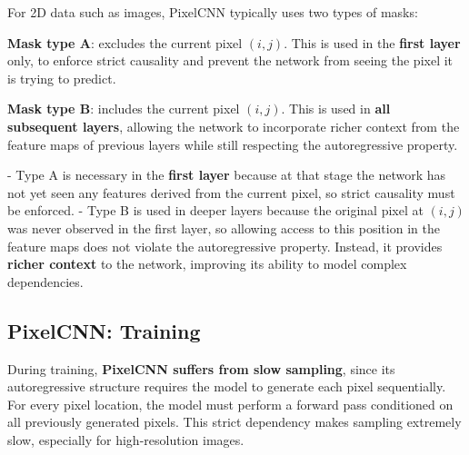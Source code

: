 For 2D data such as images, PixelCNN typically uses two types of masks:

\begin{compactitemize}
    \item \textbf{Mask type A}: excludes the current pixel \((i,j)\). This is used in the \textbf{first layer} only, to enforce strict causality and prevent the network from seeing the pixel it is trying to predict.  
    \item \textbf{Mask type B}: includes the current pixel \((i,j)\). This is used in \textbf{all subsequent layers}, allowing the network to incorporate richer context from the feature maps of previous layers while still respecting the autoregressive property.  
\end{compactitemize}

\begin{infobox}
- Type A is necessary in the \textbf{first layer} because at that stage the network has not yet seen any features derived from the current pixel, so strict causality must be enforced.  
- Type B is used in deeper layers because the original pixel at \((i,j)\) was never observed in the first layer, so allowing access to this position in the feature maps does not violate the autoregressive property. Instead, it provides \textbf{richer context} to the network, improving its ability to model complex dependencies.
\end{infobox}

\subsection{PixelCNN: Training}
During training, \textbf{PixelCNN suffers from slow sampling}, since its autoregressive structure requires the model to generate each pixel sequentially. For every pixel location, the model must perform a forward pass conditioned on all previously generated pixels. This strict dependency makes sampling extremely slow, especially for high-resolution images.

